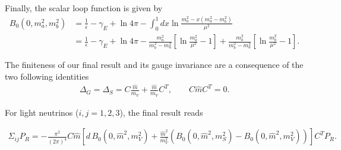 Finally, the scalar loop function is given by
\begin{align*}
 B_0 (0,m_a^2,m_b^2) &= \frac{1}{\epsilon} - \gamma_E + \ln{4 \pi} - \int_0^1 dx \ln{\frac{m_a^2-x(m_a^2 - m_b^2)}{\mu^2}}\\
 &= \frac{1}{\epsilon} - \gamma_E + \ln{4 \pi} - \frac{m_a^2}{m_b^2 - m_a^2} \left[ \ln{\frac{m_a^2}{\mu^2}}  - 1 \right] + \frac{m_b^2}{m_b^2 - m_a^2} \left[ \ln{\frac{m_b^2}{\mu^2}}  - 1 \right].
\end{align*}

The finiteness of our final result and its gauge invariance are a consequence of the two following identities
\begin{align}
 \Delta_G = \Delta_S = C \frac{\hat{m}}{m_V} + \frac{\hat{m}}{m_V}C^T, \quad \quad C \hat{m} C^T = 0.
\end{align}

For light neutrinos ($i,j=1,2,3$), the final result reads

\begin{align}
 \Sigma_{ij} P_R  = -\frac{\pi^2}{(2\pi)^4} C \hat{m}\left[ d\, B_0(0,\hat{m}^2,m_V^2) + \frac{\hat{m}^2}{m_V^2} \left( B_0 (0,\hat{m}^2,m_S^2) - B_0(0,\hat{m}^2,m_V^2) \right) \right] C^T P_R.
\end{align}
